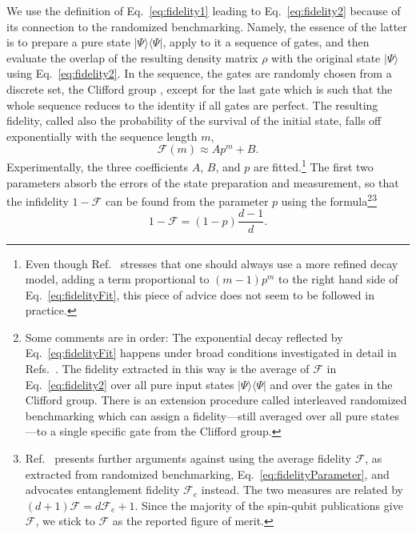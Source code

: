 \documentclass[aps, prx, showpacs, twocolumn, superscriptaddress, notitlepage, longbibliography, floatfix, nofootinbib]{revtex4-2}
\begin{document}
We use the definition of Eq.~\eqref{eq:fidelity1} leading to Eq.~\eqref{eq:fidelity2} because of its connection to the randomized benchmarking. Namely, the essence of the latter is to prepare a pure state $|\Psi\rangle \langle \Psi|$, apply to it a sequence of gates, and then evaluate the overlap of the resulting density matrix $\rho$ with the original state $|\Psi\rangle$ using Eq.~\ref{eq:fidelity2}. In the sequence, the gates are randomly chosen from a discrete set, the Clifford group \cite{gottesman_theory_1998}, except for the last gate which is such that the whole sequence reduces to the identity if all gates are perfect. The resulting fidelity, called also the probability of the survival of the initial state, falls off exponentially with the sequence length $m$,
\begin{equation}
\mathcal{F}(m) \approx A p^m + B.
\label{eq:fidelityFit}
\end{equation}
Experimentally, the three coefficients $A$, $B$, and $p$ are fitted.\footnote{Even though Ref.~\cite{magesan_characterizing_2012} stresses that one should always use a more refined decay model, adding a term proportional to $(m-1)p^m$ to the right hand side of Eq.~\eqref{eq:fidelityFit}, this piece of advice does not seem to be followed in practice.} The first two parameters absorb the errors of the state preparation and measurement, so that the infidelity $1-\mathcal{F}$ can be found from the parameter $p$ using the formula\footnote{Some comments are in order: The exponential decay reflected by Eq.~\eqref{eq:fidelityFit} happens under broad conditions investigated in detail in Refs.~\cite{magesan_characterizing_2012,epstein_investigating_2014}. The fidelity extracted in this way is the average of $\mathcal{F}$ in Eq.~\eqref{eq:fidelity2} over all pure input states $|\Psi\rangle\langle \Psi|$ and over the gates in the Clifford group. There is an extension procedure called interleaved randomized benchmarking \cite{magesan_efficient_2012} which can assign a fidelity---still averaged over all pure states---to a single specific gate from the Clifford group.}\footnote{Ref.~\cite{gilchrist_distance_2005} presents further arguments against using the average fidelity $\mathcal{F}$, as extracted from randomized benchmarking, Eq.~\eqref{eq:fidelityParameter}, and advocates entanglement fidelity $\mathcal{F}_e$ instead. The two measures are related by $(d+1)\mathcal{F}=d\mathcal{F}_e+1$. Since the majority of the spin-qubit publications give $\mathcal{F}$, we stick to $\mathcal{F}$ as the reported figure of merit.}
\begin{equation}
1-\mathcal{F} = (1-p) \frac{d-1}{d}.
\label{eq:fidelityParameter}
\end{equation}
\end{document}
